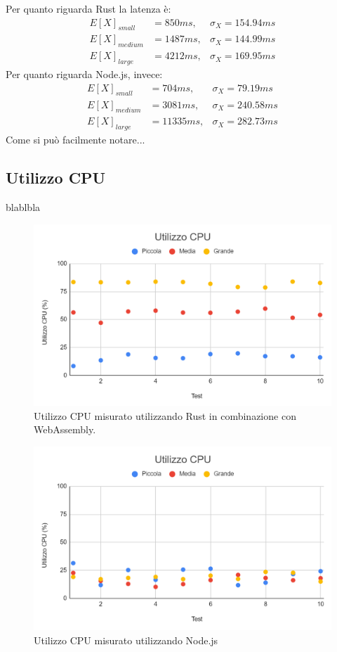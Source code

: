 Per quanto riguarda Rust la latenza è:
\begin{align*}
    E[X]_{small}&=850ms,  & \sigma_X=154.94ms\\
    E[X]_{medium}&=1487ms, & \sigma_X=144.99ms\\
    E[X]_{large}&=4212ms,  & \sigma_X=169.95ms
\end{align*}
Per quanto riguarda Node.js, invece:
\begin{align*}
    E[X]_{small}&=704ms,  & \sigma_X=79.19ms\\
    E[X]_{medium}&=3081ms, & \sigma_X=240.58ms\\
    E[X]_{large}&=11335ms,  & \sigma_X=282.73ms
\end{align*}
Come si può facilmente notare...
\subsection{Utilizzo CPU}
blablbla
\begin{figure}
    \begin{center}
            \includegraphics[width=1\columnwidth]{images/rust_cpu.png}
    \end{center}
    \caption{Utilizzo CPU misurato utilizzando Rust in combinazione con WebAssembly.}
\end{figure}
\begin{figure}
    \begin{center}
            \includegraphics[width=1\columnwidth]{images/node_cpu.png}
    \end{center}
    \caption{Utilizzo CPU misurato utilizzando Node.js}
\end{figure}
